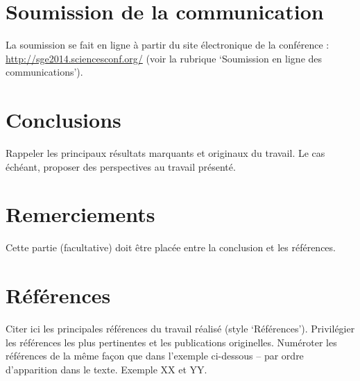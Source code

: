 \documentclass[a4paper,10pt,twocolumn]{article}
\begin{document}
\section{Soumission de la communication}

La soumission se fait en ligne à partir du site électronique de la conférence : \url{http://sge2014.sciencesconf.org/} (voir la rubrique ‘Soumission en ligne des communications’).



\section{Conclusions}

Rappeler les principaux résultats marquants et originaux du travail. Le cas échéant, proposer des perspectives au travail présenté.



\section{Remerciements}

Cette partie (facultative) doit être placée entre la conclusion et les références.



\section{Références}

Citer ici les principales références du travail réalisé (style ‘Références’). Privilégier les références les plus pertinentes et les publications originelles. Numéroter les références de la même façon que dans l’exemple ci-dessous – par ordre d’apparition dans le texte. Exemple XX\cite{bib_1} et YY\cite{bib_2,bib_3}.







\begin{thebibliography}{1}






\end{thebibliography}
\end{document}
